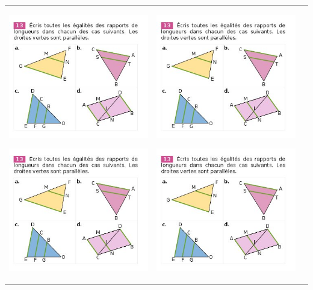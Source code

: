 \documentclass[12pt, twoside]{article}
\begin{document}
\begin{landscape}
\begin{tabular}{ccc}
\begin{minipage}{8cm}
\enskip

\includegraphics[width=7cm]{images/ex13.jpg}

\enskip
 
\includegraphics[width=7cm]{images/ex13.jpg}
\end{minipage}
&
\begin{minipage}{8cm}
\includegraphics[width=7cm]{images/ex13.jpg}


\enskip

\includegraphics[width=7cm]{images/ex13.jpg}


\end{minipage}
\end{tabular}
\end{landscape}
\end{document}
